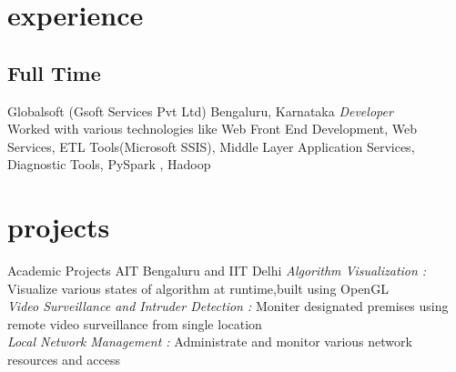 \documentclass[]{friggeri-cv} %
\begin{document}

\section{experience}

\subsection{Full Time}

\begin{entrylist}


{Globalsoft {\normalfont(Gsoft Services Pvt Ltd)}}
{Bengaluru, Karnataka}
{\emph{Developer} \\
Worked with various technologies like Web Front End Development, Web Services, 
ETL Tools(Microsoft SSIS), Middle Layer Application Services, Diagnostic Tools, 
PySpark , Hadoop }

\end{entrylist}



\section{projects}

\begin{entrylist}

{Academic Projects}
{AIT Bengaluru and IIT Delhi}
{\emph{Algorithm Visualization :}
Visualize various states of algorithm at runtime,built using OpenGL\\

\emph{Video Surveillance and Intruder Detection :}
Moniter designated premises using remote video surveillance from single location\\

\emph{Local Network Management :}
Administrate and monitor various network resources and access}
\end{entrylist}
\end{document}
